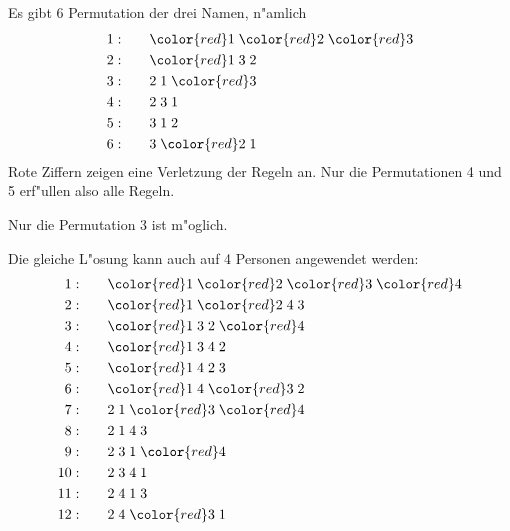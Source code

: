 \begin{loesung}
\begin{teilaufgaben}
\item
Es gibt 6 Permutation der drei Namen,  n"amlich
\begin{align*}
1:\qquad&{\color{red}1}\;{\color{red}2}\;{\color{red}3}\\
2:\qquad&{\color{red}1}\;            3 \;            2 \\
3:\qquad&            2 \;            1 \;{\color{red}3}\\
4:\qquad&            2 \;            3 \;            1 \\
5:\qquad&            3 \;            1 \;            2 \\
6:\qquad&            3 \;{\color{red}2}\;            1 
\end{align*}
Rote Ziffern zeigen eine Verletzung der Regeln an.
Nur die Permutationen 4 und 5 erf"ullen also alle Regeln.
\item
Nur die Permutation 3 ist m"oglich.
\item
Die gleiche L"osung kann auch auf 4 Personen angewendet werden:
\begin{align*}
 1:\qquad&{\color{red}1}\;{\color{red}2}\;{\color{red}3}\;{\color{red}4}\\
 2:\qquad&{\color{red}1}\;{\color{red}2}\;            4 \;            3 \\
 3:\qquad&{\color{red}1}\;            3 \;            2 \;{\color{red}4}\\
 4:\qquad&{\color{red}1}\;            3 \;            4 \;            2 \\
 5:\qquad&{\color{red}1}\;            4 \;            2 \;            3 \\
 6:\qquad&{\color{red}1}\;            4 \;{\color{red}3}\;            2 \\
%
 7:\qquad&            2 \;            1 \;{\color{red}3}\;{\color{red}4}\\
 8:\qquad&            2 \;            1 \;            4 \;            3 \\
 9:\qquad&            2 \;            3 \;            1 \;{\color{red}4}\\
10:\qquad&            2 \;            3 \;            4 \;            1 \\
11:\qquad&            2 \;            4 \;            1 \;            3 \\
12:\qquad&            2 \;            4 \;{\color{red}3}\;            1 \\

\end{align*}
\end{teilaufgaben}
\end{loesung}
